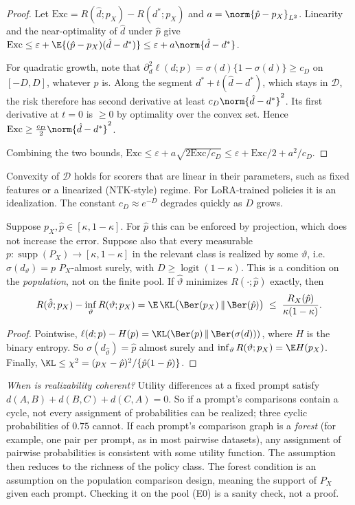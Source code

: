 \begin{proof}
Let $\mathrm{Exc}=R(\hat d;p_X)-R(d^{*};p_X)$ and $a=\norm{\hat p-p_X}_{L^2}$. Linearity and the
near-optimality of $\hat d$ under $\hat p$ give
$\mathrm{Exc}\le\varepsilon+\E\{(\hat p-p_X)(\hat d-d^{*})\}\le\varepsilon+a\norm{\hat d-d^{*}}$.

For quadratic growth, note that $\partial_d^2\ell(d;p)=\sigma(d)\{1-\sigma(d)\}\ge c_D$ on $[-D,D]$,
whatever $p$ is. Along the segment $d^{*}+t(\hat d-d^{*})$, which stays in $\mathcal D$, the risk
therefore has second derivative at least $c_D\norm{\hat d-d^{*}}^2$. Its first derivative at $t=0$
is $\ge0$ by optimality over the convex set. Hence $\mathrm{Exc}\ge\tfrac{c_D}2\norm{\hat d-d^{*}}^2$.

Combining the two bounds, $\mathrm{Exc}\le\varepsilon+a\sqrt{2\mathrm{Exc}/c_D}\le\varepsilon+\mathrm{Exc}/2+a^2/c_D$.
\end{proof}

Convexity of $\mathcal D$ holds for scorers that are linear in their parameters, such as fixed
features or a linearized (NTK-style) regime. For LoRA-trained policies it is an idealization. The
constant $c_D\approx e^{-D}$ degrades quickly as $D$ grows.

\begin{proposition}
\label{prop:bridge-fast}
Suppose $p_X,\hat p\in[\kappa,1-\kappa]$. For $\hat p$ this can be enforced by projection, which
does not increase the error. Suppose also that every measurable $p:\operatorname{supp}(P_X)\to[\kappa,1-\kappa]$ in
the relevant class is realized by some $\vartheta$, i.e.\ $\sigma(d_\vartheta)=p$ $P_X$-almost surely,
with $D\ge\operatorname{logit}(1-\kappa)$. This is a condition on the \emph{population}, not on the
finite pool.
If $\hat\vartheta$ minimizes $R(\cdot;\hat p)$ exactly, then
\[
  R(\hat\vartheta;p_X)-\inf_\vartheta R(\vartheta;p_X)=\E\,\KL\bigl(\Ber(p_X)\,\|\,\Ber(\hat p)\bigr)
  \;\le\;\frac{R_X(\hat p)}{\kappa(1-\kappa)} .
\]
\end{proposition}

\begin{proof}
Pointwise, $\ell(d;p)-H(p)=\KL(\Ber(p)\,\|\,\Ber(\sigma(d)))$, where $H$ is the binary entropy. So
$\sigma(d_{\hat\vartheta})=\hat p$ almost surely and $\inf_\vartheta R(\vartheta;p_X)=\E H(p_X)$.
Finally, $\KL\le\chi^2=(p_X-\hat p)^2/\{\hat p(1-\hat p)\}$.
\end{proof}

\emph{When is realizability coherent?} Utility differences at a fixed prompt satisfy
$d(A,B)+d(B,C)+d(C,A)=0$. So if a prompt's comparisons contain a cycle, not every assignment of
probabilities can be realized; three cyclic probabilities of $0.75$ cannot. If each prompt's
comparison graph is a \emph{forest} (for example, one pair per prompt, as in most pairwise datasets),
any assignment of pairwise probabilities is consistent with some utility function. The assumption
then reduces to the richness of the policy class. The forest condition is an assumption on the
population comparison design, meaning the support of $P_X$ given each prompt. Checking it on the pool
(E0) is a sanity check, not a proof.

